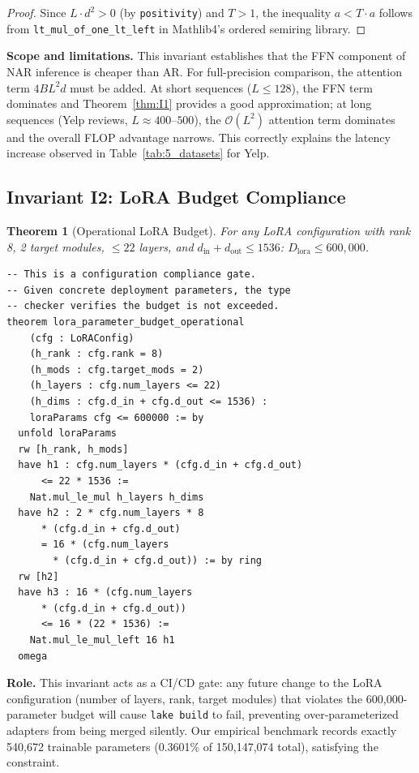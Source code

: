 \documentclass[10pt,journal,compsoc]{IEEEtran}
\newtheorem{theorem}{Theorem}
\theoremstyle{remark}
\begin{document}
\begin{proof}
Since $L \cdot d^2 > 0$ (by \texttt{positivity}) and $T > 1$, the inequality $a < T \cdot a$ follows from \texttt{lt\_mul\_of\_one\_lt\_left} in Mathlib4's ordered semiring library.
\end{proof}

\textbf{Scope and limitations.} This invariant establishes that the FFN component of NAR inference is cheaper than AR. For full-precision comparison, the attention term $4BL^2d$ must be added. At short sequences ($L \leq 128$), the FFN term dominates and Theorem~\ref{thm:I1} provides a good approximation; at long sequences (Yelp reviews, $L \approx 400$--$500$), the $\mathcal{O}(L^2)$ attention term dominates and the overall FLOP advantage narrows. This correctly explains the latency increase observed in Table~\ref{tab:5_datasets} for Yelp.

\subsection{Invariant I2: LoRA Budget Compliance}

\begin{theorem}[Operational LoRA Budget]
\label{thm:I2}
For any LoRA configuration with rank 8, 2 target modules, $\leq 22$ layers, and $d_\text{in} + d_\text{out} \leq 1536$:
$D_\text{lora} \leq 600{,}000$.
\end{theorem}

\begin{lstlisting}[caption={Invariant I2 in Lean 4 --- Budget Compliance Checker}]
-- This is a configuration compliance gate.
-- Given concrete deployment parameters, the type
-- checker verifies the budget is not exceeded.
theorem lora_parameter_budget_operational
    (cfg : LoRAConfig)
    (h_rank : cfg.rank = 8)
    (h_mods : cfg.target_mods = 2)
    (h_layers : cfg.num_layers <= 22)
    (h_dims : cfg.d_in + cfg.d_out <= 1536) :
    loraParams cfg <= 600000 := by
  unfold loraParams
  rw [h_rank, h_mods]
  have h1 : cfg.num_layers * (cfg.d_in + cfg.d_out)
      <= 22 * 1536 :=
    Nat.mul_le_mul h_layers h_dims
  have h2 : 2 * cfg.num_layers * 8
      * (cfg.d_in + cfg.d_out)
      = 16 * (cfg.num_layers
        * (cfg.d_in + cfg.d_out)) := by ring
  rw [h2]
  have h3 : 16 * (cfg.num_layers
      * (cfg.d_in + cfg.d_out))
      <= 16 * (22 * 1536) :=
    Nat.mul_le_mul_left 16 h1
  omega
\end{lstlisting}

\textbf{Role.} This invariant acts as a CI/CD gate: any future change to the LoRA configuration (number of layers, rank, target modules) that violates the 600,000-parameter budget will cause \texttt{lake build} to fail, preventing over-parameterized adapters from being merged silently. Our empirical benchmark records exactly 540,672 trainable parameters (0.3601\% of 150,147,074 total), satisfying the constraint.
\end{document}
